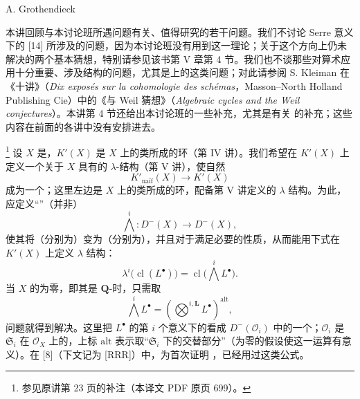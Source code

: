 \begin{center}A. Grothendieck\end{center}
本讲回顾与本讨论班所遇问题有关、值得研究的若干问题。我们不讨论 Serre 意义下的 [14] 所涉及的问题，因为本讨论班没有用到这一理论；关于这个方向上仍未解决的两个基本猜想，特别请参见该书第 V 章第 4 节。我们也不谈那些对算术应用十分重要、涉及结构的问题，尤其是上的这类问题；对此请参阅 S. Kleiman 在《十讲》（\textit{Dix exposés sur la cohomologie des schémas}，Masson--North Holland Publishing Cie）中的《与 Weil 猜想》（\textit{Algebraic cycles and the Weil conjectures}）。本讲第 4 节还给出本讨论班的一些补充，尤其是有关 的补充；这些内容在前面的各讲中没有安排进去。

\footnote{参见原讲第 23 页的补注（本译文 PDF 原页 699）。}
设 $X$ 是，$K'(X)$ 是 $X$ 上的类所成的环（第 IV 讲）。我们希望在 $K'(X)$ 上定义一个关于 $X$ 具有的 $\lambda$-结构（第 V 讲），使自然
\[K'_{\text{naïf}}(X)\longrightarrow K'(X)\]
成为一个；这里左边是 $X$ 上的类所成的环，配备第 V 讲定义的 $\lambda$ 结构。为此，应定义“”（并非）
\[\bigwedge^i:D^-(X)\longrightarrow D^-(X),\]
使其将（分别为）变为（分别为），并且对于满足必要的性质，从而能用下式在 $K'(X)$ 上定义 $\lambda$ 结构：
\[\lambda^i\bigl(\operatorname{cl}(L^\bullet)\bigr)
=\operatorname{cl}\bigl(\bigwedge^i L^\bullet\bigr).\tag{1.1}\]
当 $X$ 的为零，即其是 $\mathbf Q$-时，只需取
\[\bigwedge^i L^\bullet
=\left(\mathop{\bigotimes}\nolimits^{i,\mathbf L}L^\bullet\right)^{\mathrm{alt}},\tag{1.2}\]
问题就得到解决。这里把 $L^\bullet$ 的第 $i$ 个意义下的看成 $D^-(\mathscr O_i)$ 中的一个；$\mathscr O_i$ 是 $\mathfrak S_i$ 在 $\mathscr O_X$ 上的，上标 $\mathrm{alt}$ 表示取“$\mathfrak S_i$ 下的交替部分”（为零的假设使这一运算有意义）。在 [8]（下文记为 [RRR]）中，为首次证明 ，已经用过这类公式。

